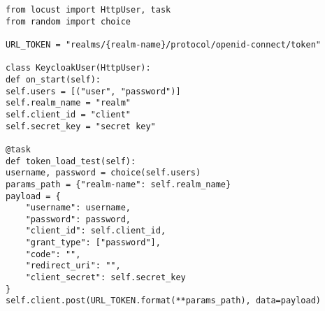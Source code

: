 \lstset{language=Python}
\lstset{frame=lines}
\lstset{basicstyle=\footnotesize}
\begin{lstlisting}
from locust import HttpUser, task
from random import choice

URL_TOKEN = "realms/{realm-name}/protocol/openid-connect/token"

class KeycloakUser(HttpUser):
def on_start(self):
self.users = [("user", "password")]
self.realm_name = "realm"
self.client_id = "client"
self.secret_key = "secret key"

@task
def token_load_test(self):
username, password = choice(self.users)
params_path = {"realm-name": self.realm_name}
payload = {
	"username": username,
	"password": password,
	"client_id": self.client_id,
	"grant_type": ["password"],
	"code": "",
	"redirect_uri": "",
	"client_secret": self.secret_key
}
self.client.post(URL_TOKEN.format(**params_path), data=payload)

\end{lstlisting}


